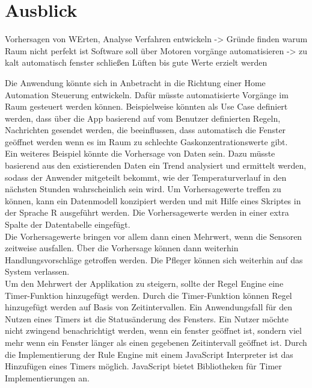 
\chapter{Ausblick}
Vorhersagen von WErten,
Analyse Verfahren entwickeln -> Gründe finden warum Raum nicht perfekt ist
Software soll über Motoren vorgänge automatisieren -> zu kalt automatisch fenster schließen
Lüften bis gute Werte erzielt werden

Die Anwendung könnte sich in Anbetracht in die Richtung einer Home Automation Steuerung entwickeln. Dafür müsste automatisierte Vorgänge im Raum gesteuert werden können. Beispielweise könnten als Use Case definiert werden, dass über die App basierend auf vom Benutzer definierten Regeln, Nachrichten gesendet werden, die beeinflussen, dass automatisch die Fenster geöffnet werden wenn es im Raum zu schlechte Gaskonzentrationswerte gibt.  
\\Ein weiteres Beispiel könnte die Vorhersage von Daten sein. Dazu müsste basierend aus den existierenden Daten ein Trend analysiert und ermittelt werden, sodass der Anwender mitgeteilt bekommt, wie der Temperaturverlauf in den nächsten Stunden wahrscheinlich sein wird. Um Vorhersagewerte treffen zu können, kann ein Datenmodell konzipiert werden und mit Hilfe eines Skriptes in der Sprache R ausgeführt werden. Die Vorhersagewerte werden in einer extra Spalte der Datentabelle eingefügt.\\
Die Vorhersagewerte bringen vor allem dann einen Mehrwert, wenn die Sensoren zeitweise ausfallen. Über die Vorhersage können dann weiterhin Handlungsvorschläge getroffen werden. Die Pfleger können sich weiterhin auf das System verlassen.\\
Um den Mehrwert der Applikation zu steigern, sollte der Regel Engine eine Timer-Funktion hinzugefügt werden. Durch die Timer-Funktion können Regel hinzugefügt werden auf Basis von Zeitintervallen. Ein Anwendungsfall für den Nutzen eines Timers ist die Statusänderung des Fensters. Ein Nutzer möchte nicht zwingend benachrichtigt werden, wenn ein fenster geöffnet ist, sondern viel mehr wenn ein Fenster länger als einen gegebenen Zeitintervall geöffnet ist. Durch die Implementierung der Rule Engine mit einem JavaScript Interpreter ist das Hinzufügen eines Timers möglich. JavaScript bietet Bibliotheken für Timer Implementierungen an.\\